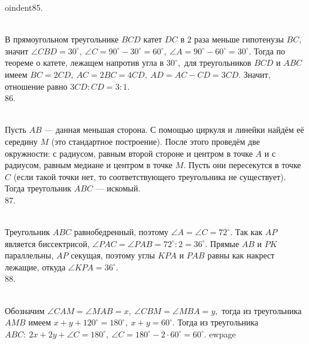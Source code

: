 oindent85. \begin{figure}[ht!]
\end{figure}\\
В прямоугольном треугольнике $BCD$ катет $DC$ в 2 раза меньше гипотенузы $BC,$ значит $\angle CBD=30^\circ,\ \angle C=90^\circ-30^\circ=60^\circ,\ \angle A=90^\circ-60^\circ=30^\circ.$ Тогда по теореме о катете, лежащем напротив угла в $30^\circ,$ для треугольников $BCD$ и $ABC$ имеем $BC=2CD,\ AC=2BC=4CD,\ AD=AC-CD=3CD.$ Значит, отношение равно $3CD:CD=3:1.$\\
86. \begin{figure}[ht!]
\end{figure}\\
Пусть $AB$ --- данная меньшая сторона. С помощью циркуля и линейки найдём её середину $M$ (это стандартное построение). После этого проведём две окружности: с радиусом, равным второй стороне и центром в точке $A$ и с радиусом, равным медиане и центром в точке $M.$ Пусть они пересекутся в точке $C$ (если такой точки нет, то соответствующего треугольника не существует). Тогда треугольник $ABC$ --- искомый.\\
87. \begin{figure}[ht!]
\end{figure}\\
Треугольник $ABC$ равнобедренный, поэтому $\angle A=\angle C =72^\circ.$ Так как $AP$ является биссектрисой, $\angle PAC=\angle PAB=72^\circ:2=36^\circ.$ Прямые $AB$ и $PK$ параллельны, $AP$ секущая, поэтому углы $KPA$ и $PAB$ равны как накрест лежащие, откуда $\angle KPA=36^\circ.$\\
88. \begin{figure}[ht!]
\end{figure}\\
Обозначим $\angle CAM=\angle MAB=x,\ \angle CBM=\angle MBA=y,$ тогда из треугольника $AMB$ имеем $x+y+120^\circ=180^\circ,\ x+y=60^\circ.$ Тогда из треугольника $ABC:\ 2x+2y+\angle C=180^\circ,\ \angle C=180^\circ-2\cdot60^\circ=60^\circ.$
ewpage

